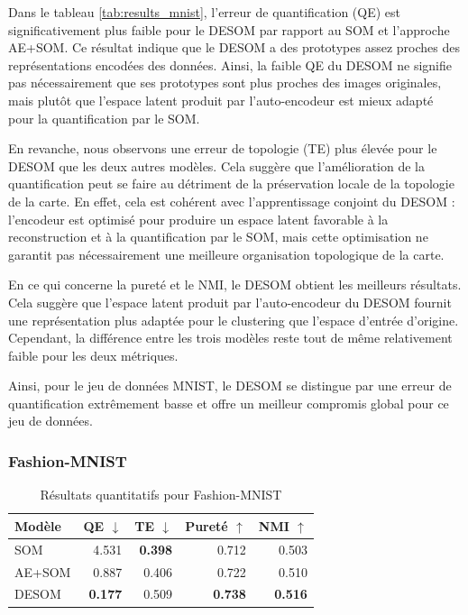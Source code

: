 \documentclass[12pt,a4paper]{report}
\begin{document}
Dans le tableau \ref{tab:results_mnist}, l'erreur de quantification (QE) est significativement plus faible pour le DESOM par rapport au SOM et l'approche AE+SOM.
Ce résultat indique que le DESOM a des prototypes assez proches des représentations encodées des données.
Ainsi, la faible QE du DESOM ne signifie pas nécessairement que ses prototypes sont plus proches des images originales, 
mais plutôt que l'espace latent produit par l'auto-encodeur est mieux adapté pour la quantification par le SOM.

En revanche, nous observons une erreur de topologie (TE) plus élevée pour le DESOM que les deux autres modèles.
Cela suggère que l'amélioration de la quantification peut se faire au détriment de la préservation locale de la topologie de la carte.
En effet, cela est cohérent avec l'apprentissage conjoint du DESOM : 
l'encodeur est optimisé pour produire un espace latent favorable à la reconstruction et à la quantification par le SOM, 
mais cette optimisation ne garantit pas nécessairement une meilleure organisation topologique de la carte.

En ce qui concerne la pureté et le NMI, le DESOM obtient les meilleurs résultats.
Cela suggère que l'espace latent produit par l'auto-encodeur du DESOM fournit une représentation plus adaptée pour le clustering que l'espace d'entrée d'origine.
Cependant, la différence entre les trois modèles reste tout de même relativement faible pour les deux métriques.

Ainsi, pour le jeu de données MNIST, 
le DESOM se distingue par une erreur de quantification extrêmement basse et offre un meilleur compromis global pour ce jeu de données.

\subsubsection{Fashion-MNIST}
\begin{table}[H]
\centering
\caption{Résultats quantitatifs pour Fashion-MNIST}
\label{tab:results_fashion_mnist}
\begin{tabular}{lrrrr}
\toprule
Modèle & QE $\downarrow$ & TE $\downarrow$ & Pureté $\uparrow$ & NMI $\uparrow$ \\
\midrule
SOM & 4.531 & \textbf{0.398} & 0.712 & 0.503 \\
AE+SOM & 0.887 & 0.406 & 0.722 & 0.510 \\
DESOM & \textbf{0.177} & 0.509 & \textbf{0.738} & \textbf{0.516} \\
\bottomrule
\end{tabular}
\end{table}
\end{document}
